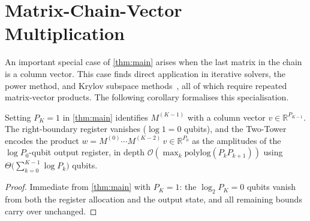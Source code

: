 \documentclass[a4paper,UKenglish,cleveref,autoref,thm-restate]{socg-lipics-v2021}
\newcommand{\norm}[1]{\left\| #1 \right\|}
\begin{document}


\section{Matrix-Chain-Vector Multiplication}
\label{sec:vector}
An important special case of \cref{thm:main} arises when the last matrix in the chain is a column vector. This case finds direct application in iterative solvers, the power method, and Krylov subspace methods~\cite{GolubVanLoan1996}, all of which require repeated matrix-vector products. The following corollary formalises this specialisation.

\begin{corollary}\label{cor:vector-case}
  Setting $P_K = 1$ in \cref{thm:main} identifies $M^{(K-1)}$ with
  a column vector $v \in \mathbb{R}^{P_{K-1}}$.
  The right-boundary register vanishes ($\log 1 = 0$ qubits), and
  the Two-Tower encodes the product
  $w = M^{(0)}\cdots M^{(K-2)}\,v \in \mathbb{R}^{P_0}$
  as the amplitudes of the $\log P_0$-qubit output register, in
  depth $\mathcal{O}(\max_k {\mathrm {polylog}}(P_k P_{k+1}))$ using
  $\Theta\!\bigl(\sum_{k=0}^{K-1} \log P_k \bigr)$
  qubits.
\end{corollary}
\begin{proof}
  Immediate from \cref{thm:main} with $P_K = 1$: the
  $\log_2 P_K= 0$ qubits vanish from both the register allocation
  and the output state, and all remaining bounds carry over unchanged.
\end{proof}
\end{document}
